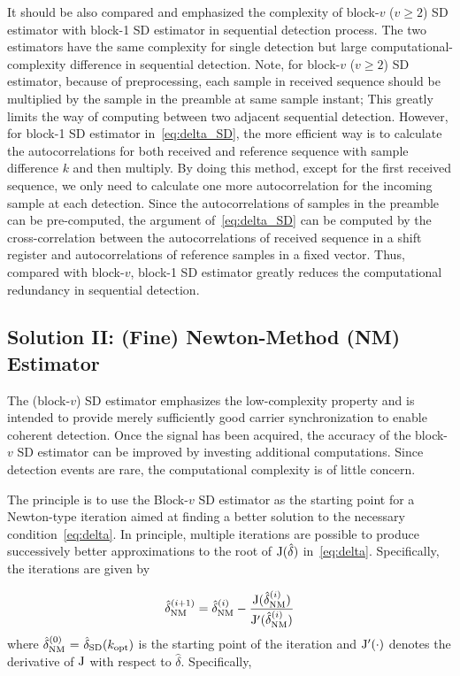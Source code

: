 It should be also compared and emphasized the complexity of block-$v$ ($v\geq 2$) SD estimator
with block-1 SD estimator in sequential detection process. The two estimators have the same
complexity for single detection but large computational-complexity difference in sequential detection.
Note, for block-$v$ ($v\geq 2$) SD estimator, because of preprocessing, each sample in received sequence should
be multiplied by the sample in the preamble at same sample instant; 
This greatly limits the way of computing between two adjacent sequential detection.
However, for block-1 SD estimator in~\eqref{eq:delta_SD}, the more efficient way is to 
calculate the autocorrelations for both received and reference sequence with sample difference $k$ and then multiply.
By doing this method, except for the first received sequence,     
we only need to calculate one more autocorrelation for the incoming sample at each detection.
Since the autocorrelations of samples in the preamble can be pre-computed, the argument of~\eqref{eq:delta_SD}
can be computed by the cross-correlation between 
the autocorrelations of received sequence in a shift register
and autocorrelations of reference samples in a fixed vector. 
Thus, compared with block-$v$, block-1 SD estimator greatly reduces the computational redundancy in sequential detection.

\subsection{Solution II: (Fine) Newton-Method (NM) Estimator}

The (block-$v$) SD estimator emphasizes the low-complexity property and is intended to provide merely sufficiently good carrier synchronization
to enable coherent detection. 
Once the signal has been acquired, the accuracy of the block-$v$ SD estimator can be improved by 
investing additional computations. Since detection events are rare, the computational complexity is of little concern.

The principle is to use the Block-$v$ SD estimator as the starting point for a Newton-type iteration 
aimed at finding a better solution to the necessary condition~\eqref{eq:delta}. 
In principle, multiple iterations are possible to produce successively better approximations to the root of
$\mathrm{J}(\hat{\delta})$ in~\eqref{eq:delta}. Specifically, the iterations are given by

\begin{equation}
    \label{eq:iter_NM_est}
    \hat{\delta}_{\text{NM}}^{(i+1)}=\hat{\delta}_{\text{NM}}^{(i)}-
    \frac{\mathrm{J}(\hat{\delta}_{\text{NM}}^{(i)})}{\mathrm{J}^\prime(\hat{\delta}_{\text{NM}}^{(i)})}
  \end{equation}
where $\hat{\delta}_{\text{NM}}^{(0)}~{=}~\hat{\delta}_{\text{SD}}(k_{\text{opt}})$ is the starting point of the iteration and
$\mathrm{J}^\prime(\cdot)$ denotes the derivative of $\mathrm{J}$ with respect to $\hat{\delta}$. Specifically,

